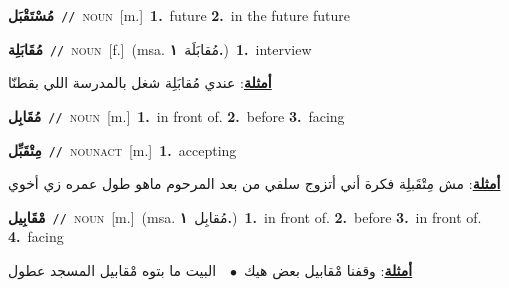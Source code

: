 \documentclass[10pt,a4paper,twoside]{article} %
\begin{document}
\begin{multicols}{2}
{\setlength\topsep{0pt}\textbf{\foreignlanguage{arabic}{مُسْتَقْبَل}}\ {\color{gray}\texttt{//}\color{black}}\ \textsc{noun}\ [m.]\ \textbf{1.}~future  \textbf{2.}~in the future future\ } \vspace{2mm}

{\setlength\topsep{0pt}\textbf{\foreignlanguage{arabic}{مُقَابَلِة}}\ {\color{gray}\texttt{//}\color{black}}\ \textsc{noun}\ [f.]\ \color{gray}(msa. \foreignlanguage{arabic}{مُقابَلَة}~\foreignlanguage{arabic}{\textbf{١.}})\color{black}\ \textbf{1.}~interview\  \begin{flushright}\color{gray}\foreignlanguage{arabic}{\textbf{\underline{\foreignlanguage{arabic}{أمثلة}}}: عندي مُقابَلِة شغل بالمدرسة اللي بقطنّا}\end{flushright}\color{black}} \vspace{2mm}

{\setlength\topsep{0pt}\textbf{\foreignlanguage{arabic}{مُقَابِل}}\ {\color{gray}\texttt{//}\color{black}}\ \textsc{noun}\ [m.]\ \textbf{1.}~in front of.  \textbf{2.}~before  \textbf{3.}~facing\ } \vspace{2mm}

{\setlength\topsep{0pt}\textbf{\foreignlanguage{arabic}{مِتْقَبِّل}}\ {\color{gray}\texttt{//}\color{black}}\ \textsc{noun\textunderscore act}\ [m.]\ \textbf{1.}~accepting\  \begin{flushright}\color{gray}\foreignlanguage{arabic}{\textbf{\underline{\foreignlanguage{arabic}{أمثلة}}}: مش مِتْقَبلِة فكرة أني أتزوج سلفي من بعد المرحوم ماهو طول عمره زي أخوي}\end{flushright}\color{black}} \vspace{2mm}

{\setlength\topsep{0pt}\textbf{\foreignlanguage{arabic}{مْقَابِيل}}\ {\color{gray}\texttt{//}\color{black}}\ \textsc{noun}\ [m.]\ \color{gray}(msa. \foreignlanguage{arabic}{مُقابِل}~\foreignlanguage{arabic}{\textbf{١.}})\color{black}\ \textbf{1.}~in front of.  \textbf{2.}~before  \textbf{3.}~in front of.  \textbf{4.}~facing\  \begin{flushright}\color{gray}\foreignlanguage{arabic}{\textbf{\underline{\foreignlanguage{arabic}{أمثلة}}}: وقفنا مْقابيل بعض هيك\ $\bullet$\ \  البيت ما بتوه مْقابيل المسجد عطول}\end{flushright}\color{black}} \vspace{2mm}


\end{multicols}
\end{document}
